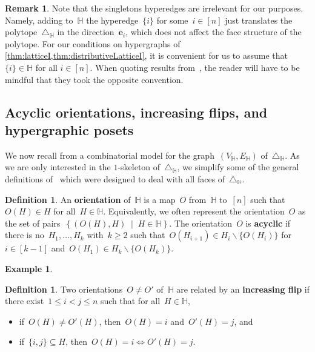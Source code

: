 \documentclass[reqno]{amsart}
\theoremstyle{definition}
\newtheorem{definition}[theorem]{Definition}
\newtheorem{example}[theorem]{Example}
\newtheorem{remark}[theorem]{Remark}
\renewcommand{\b}[1]{\boldsymbol{#1}} %
\newcommand{\set}[2]{\left\{ #1 \;\middle|\; #2 \right\}} %
\newcommand{\ssm}{\smallsetminus} %
\newcommand{\simplex}{\triangle} %
\newcommand{\defn}[1]{\textbf{\textsf{\color{PineGreen} #1}}} %
\newcommand{\vincent}[1]{\todo[size=\tiny,color=blue!30]{ #1 \\ \hfill --- V.}\,}
\newcommand{\HH}{\mathbb H}  %
\begin{document}
\begin{remark}
\label{rem:single}
Note that the singletons hyperedges are irrelevant for our purposes.
Namely, adding to~$\HH$ the hyperedge~$\{i\}$ for some~$i \in [n]$ just translates the polytope~$\simplex_\HH$ in the direction~$\b{e}_i$, which does not affect the face structure of the polytope.
For our conditions on hypergraphs of \cref{thm:latticeI,thm:distributiveLatticeI}, it is convenient for us to assume that $\{i\} \in \HH$ for all $i \in [n]$.
When quoting results from~\cite{BenedettiBergeronMachacek}, the reader will have to be mindful that they took the opposite convention.
\end{remark}



\subsection{Acyclic orientations, increasing flips, and hypergraphic posets} 
\label{subsec:P_H}

We now recall from \cite[Thm.~2.18]{BenedettiBergeronMachacek} a combinatorial model for the graph~$(V_\HH, E_\HH)$ of~$\simplex_\HH$.
As we are only interested in the $1$-skeleton of~$\simplex_\HH$, we simplify some of the general definitions of~\cite{BenedettiBergeronMachacek} which were designed to deal with all faces of~$\simplex_\HH$.

\begin{definition}
\label{def:acyclicOrientation}
An \defn{orientation} of~$\HH$ is a map~$O$ from~$\HH$ to~$[n]$ such that~$O(H) \in H$ for all~${H \in \HH}$.
Equivalently, we often represent the orientation~$O$ as the set of pairs~$\set{(O(H),H)}{H \in \HH}$.
The orientation~$O$ is \defn{acyclic} if there is no~$H_1, \dots, H_k$ with~$k \ge 2$ such that~$O(H_{i+1}) \in H_i \ssm \{O(H_i)\}$ for~$i \in [k-1]$ and~$O(H_1) \in H_k \ssm \{O(H_k)\}$.
\end{definition}

\begin{example}
\vincent{todo}
\end{example}

\begin{definition}
\label{def:flip}
Two orientations~$O \ne O'$ of~$\HH$ are related by an \defn{increasing flip} if there exist~${1 \le i < j \le n}$ such that for all~$H \in \HH$, 
\begin{itemize}
\item if~$O(H) \ne O'(H)$, then~$O(H) = i$ and~$O'(H) = j$, and
\item if~$\{i,j\} \subseteq H$, then~$O(H) = i \iff O'(H) = j$.
\end{itemize}
\end{definition}
\end{document}
